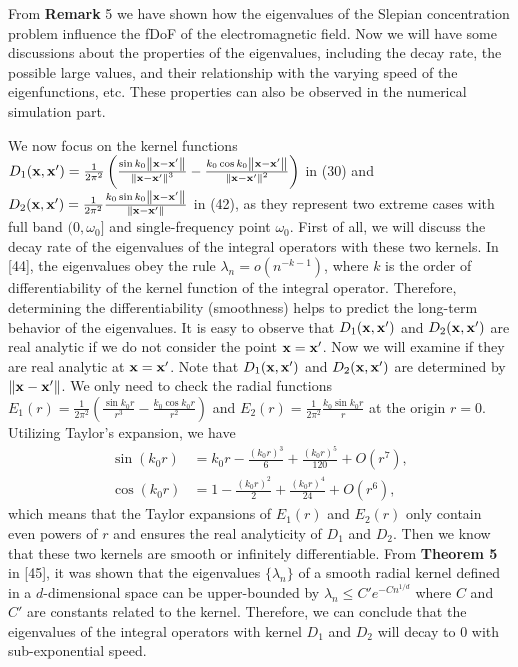 \documentclass[a4paper,12pt]{article}
\begin{document}
\begin{framed}
{   \quad From {\bf Remark} 5 we have shown how the eigenvalues of the Slepian concentration problem influence the fDoF of the electromagnetic field. Now we will have some discussions about the properties of the eigenvalues, including the decay rate, the possible large values, and their relationship with the varying speed of the eigenfunctions, etc. These properties can also be observed in the numerical simulation part. 
   
   \quad We now focus on the kernel functions $D_1({\bf x},{\bf x}')=\frac{1}{2\pi^2} \left( \frac{\sin k_0\left\| {\bf x}-{\bf x}' \right\|}{\left\| {\bf x}-{\bf x}' \right\|^3}-\frac{k_0\cos k_0\left\| {\bf x}-{\bf x}' \right\|}{\left\| {\bf x}-{\bf x}' \right\|^2} \right)$ in (30) and $D_2({\bf x},{\bf x}') = \frac{1}{2\pi^2} \frac{k_0\sin k_0 \left\| {\bf x}-{\bf x}' \right\|}{\left\|  {\bf x}-{\bf x}' \right\|}$ in (42), as they represent two extreme cases with full band $(0,\omega_0]$ and single-frequency point $\omega_0$. First of all, we will discuss the decay rate of the eigenvalues of the integral operators with these two kernels. In [44], the eigenvalues obey the rule $\lambda_n  = o(n^{-k-1})$, where $k$ is the order of differentiability of the kernel function of the integral operator. Therefore, determining the differentiability (smoothness) helps to predict the long-term behavior of the eigenvalues.
   It is easy to observe that $D_1({\bf x},{\bf x}')$ and $D_2({\bf x},{\bf x}')$ are real analytic if we do not consider the point ${\bf x} = {\bf x}'$. Now we will examine if they are real analytic at ${\bf x} = {\bf x}'$. 
   Note that $D_1({\bf x},{\bf x}')$ and $D_2({\bf x},{\bf x}')$ are determined by $\left\|{\bf x}-{\bf x}'\right\|$. We only need to check the radial functions $E_1(r) = \frac{1}{2\pi^2} \left( \frac{\sin k_0 r}{r^3} - \frac{k_0 \cos k_0 r}{r^2} \right)$ and $E_2(r) = \frac{1}{2 \pi^2} \frac{k_0 \sin k_0 r}{r}$ at the origin $r = 0$. Utilizing Taylor's expansion, we have 
   \begin{equation}\begin{aligned}\sin(k_0r)&=k_0r-\frac{(k_0r)^3}{6}+\frac{(k_0r)^5}{120}+O(r^7),\\\cos(k_0r)&=1-\frac{(k_0r)^2}{2}+\frac{(k_0r)^4}{24}+O(r^6),\end{aligned}\end{equation}
   which means that the Taylor expansions of $E_1(r)$ and $E_2(r)$ only contain even powers of $r$ and ensures the real analyticity of $D_1$ and $D_2$. Then we know that these two kernels are smooth or infinitely differentiable. From {\bf Theorem 5} in [45], it was shown that the eigenvalues $\{\lambda_n\}$ of a smooth radial kernel defined in a $d$-dimensional space can be upper-bounded by $\lambda_n \leqslant C' e^{-C n^{1/d}}$ where $C$ and $C'$ are constants related to the kernel. Therefore, we can conclude that the eigenvalues of the integral operators with kernel $D_1$ and $D_2$ will decay to 0 with sub-exponential speed.   
   
}
\end{framed}
\end{document}
